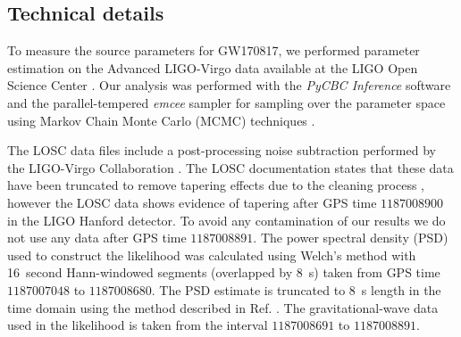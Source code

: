 \subsection{Technical details}\label{sec:pe_methods_ceos_tech_details}
To measure the source parameters for GW170817, we performed parameter estimation on the Advanced LIGO-Virgo data available at the LIGO Open Science Center \cite{Vallisneri:2014vxa,gw170817-losc}. 
Our analysis was performed with the \textit{PyCBC Inference} software \cite{Biwer:2018osg,alex_nitz_2018_1208115} and the parallel-tempered \textit{emcee} sampler \cite{emcee,vousden:2016} for sampling over the parameter space using Markov Chain Monte Carlo (MCMC) techniques \cite{mcmc}. 

The LOSC data files include a post-processing noise subtraction performed by the LIGO-Virgo Collaboration \cite{gw170817-losc,gw170817-noise}. The LOSC documentation states that these data have been truncated to remove tapering effects due to the cleaning process \cite{gw170817-losc}, however the LOSC data shows evidence of tapering after GPS time $1187008900$ in the LIGO Hanford detector. To avoid any contamination of our results we do not use any data after GPS time $1187008891$. The power spectral density (PSD) used to construct the likelihood was calculated using Welch's method \cite{1161901} with 16~second Hann-windowed segments (overlapped by 8~s) taken from GPS time $1187007048$ to $1187008680$. The PSD estimate is truncated to 8~s length in the time domain using the method described in Ref. \cite{Allen:2005fk}. The gravitational-wave data used in the likelihood is taken from the interval $1187008691$ to $1187008891$. 

